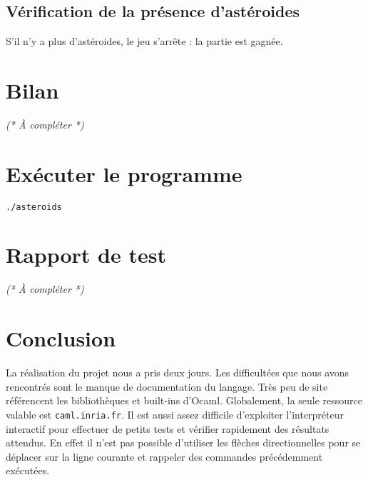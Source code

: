 \documentclass[a4paper,10pt,openany,oneside]{report}
\begin{document}
\subsection{Vérification de la présence d'astéroides}

S'il n'y a plus d'astéroides, le jeu s'arrête : la partie est gagnée.

\section{Bilan}

\textit{(* À compléter *)}

\section{Exécuter le programme}

\texttt{./asteroids}

\section{Rapport de test}

\textit{(* À compléter *)}

\section{Conclusion}

La réalisation du projet nous a pris deux jours. Les difficultées que nous
avons rencontrés sont le manque de documentation du langage. Très peu de site
référencent les bibliothèques et built-ins d'Ocaml. Globalement, la seule
ressource valable est \texttt{caml.inria.fr}. Il est aussi assez difficile
d'exploiter l'interpréteur interactif pour effectuer de petits tests et
vérifier rapidement des résultats attendus. En effet il n'est pas possible
d'utiliser les flèches directionnelles pour se déplacer sur la ligne courante
et rappeler des commandes précédemment exécutées.
\end{document}
